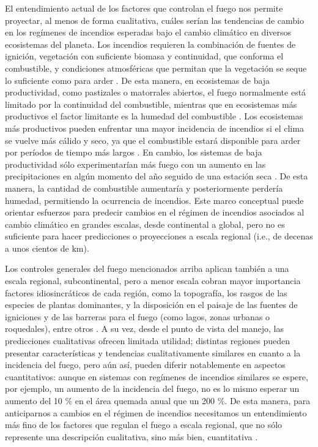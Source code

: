 El entendimiento actual de los factores que controlan el fuego nos permite proyectar, al menos de forma cualitativa, cuáles serían las tendencias de cambio en los regímenes de incendios esperadas bajo el cambio climático en diversos ecosistemas del planeta. Los incendios requieren la combinación de fuentes de ignición, vegetación con suficiente biomasa y continuidad, que conforma el combustible, y condiciones atmosféricas que permitan que la vegetación se seque lo suficiente como para arder \citep{krawchuk_global_2009, krawchuk_constraints_2011, bowman2014pyrogeography}. De esta manera, en ecosistemas de baja productividad, como pastizales o matorrales abiertos, el fuego normalmente está limitado por la continuidad del combustible, mientras que en ecosistemas más productivos el factor limitante es la humedad del combustible \citep{pausas2012fuel, pausas_global_2013}. Los ecosistemas más productivos pueden enfrentar una mayor incidencia de incendios si el clima se vuelve más cálido y seco, ya que el combustible estará disponible para arder por períodos de tiempo más largos \citep{kitzberger_projections_2022}. En cambio, los sistemas de baja productividad sólo experimentarían más fuego con un aumento en las precipitaciones en algún momento del año seguido de una estación seca \citep{pricope2012spatio, fischer2015influence, villagra_spatial_2024}. De esta manera, la cantidad de combustible aumentaría y posteriormente perdería humedad, permitiendo la ocurrencia de incendios. Este marco conceptual puede orientar esfuerzos para predecir cambios en el régimen de incendios asociados al cambio climático en grandes escalas, desde continental a global, pero no es suficiente para hacer predicciones o proyecciones a escala regional (i.e., de decenas a unos cientos de km).

Los controles generales del fuego mencionados arriba aplican también a una escala regional, subcontinental, pero a menor escala cobran mayor importancia factores idiosincráticos de cada región, como la topografía, los rasgos de las especies de plantas dominantes, y la disposición en el paisaje de las fuentes de igniciones y de las barreras para el fuego (como lagos, zonas urbanas o roquedales), entre otros \citep{rollins2004mapping, curt2018modelling}. A su vez, desde el punto de vista del manejo, las predicciones cualitativas ofrecen limitada utilidad; distintas regiones pueden presentar características y tendencias cualitativamente similares en cuanto a la incidencia del fuego, pero aún así, pueden diferir notablemente en aspectos cuantitativos: aunque en sistemas con regímenes de incendios similares se espere, por ejemplo, un aumento de la incidencia del fuego, no es lo mismo esperar un aumento del 10 \% en el área quemada anual que un 200 \%. De esta manera, para anticiparnos a cambios en el régimen de incendios necesitamos un entendimiento más fino de los factores que regulan el fuego a escala regional, que no sólo represente una descripción cualitativa, sino más bien, cuantitativa \citep{bondavalli2009quantitative}.

